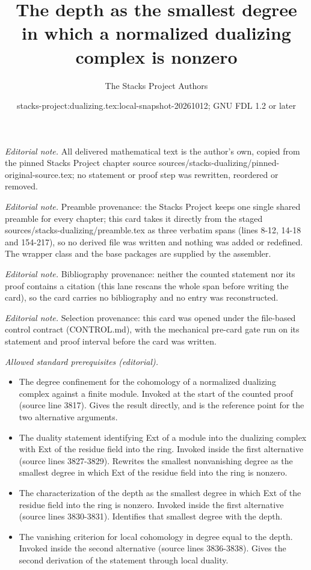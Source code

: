 \documentclass[10pt,a4paper]{amsart}
\title{The depth as the smallest degree in which a normalized dualizing complex is nonzero}
\author{The Stacks Project Authors}
\date{stacks-project:dualizing.tex:local-snapshot-20261012; GNU FDL 1.2 or later}
\theoremstyle{plain}
\theoremstyle{definition}
\theoremstyle{remark}
\numberwithin{equation}{subsection}
\begin{document}
\maketitle
\noindent\textit{Editorial note.} All delivered mathematical text is the author's own, copied from the pinned Stacks Project chapter source sources/stacks-dualizing/pinned-original-source.tex; no statement or proof step was rewritten, reordered or removed.\par\medskip
\noindent\textit{Editorial note.} Preamble provenance: the Stacks Project keeps one single shared preamble for every chapter; this card takes it directly from the staged sources/stacks-dualizing/preamble.tex as three verbatim spans (lines 8-12, 14-18 and 154-217), so no derived file was written and nothing was added or redefined. The wrapper class and the base packages are supplied by the assembler.\par\medskip
\noindent\textit{Editorial note.} Bibliography provenance: neither the counted statement nor its proof contains a citation (this lane rescans the whole span before writing the card), so the card carries no bibliography and no entry was reconstructed.\par\medskip
\noindent\textit{Editorial note.} Selection provenance: this card was opened under the file-based control contract (CONTROL.md), with the mechanical pre-card gate run on its statement and proof interval before the card was written.\par\medskip
\noindent\textit{Allowed standard prerequisites (editorial).}\begin{itemize}
\item The degree confinement for the cohomology of a normalized dualizing complex against a finite module. Invoked at the start of the counted proof (source line 3817). Gives the result directly, and is the reference point for the two alternative arguments.
\item The duality statement identifying Ext of a module into the dualizing complex with Ext of the residue field into the ring. Invoked inside the first alternative (source lines 3827-3829). Rewrites the smallest nonvanishing degree as the smallest degree in which Ext of the residue field into the ring is nonzero.
\item The characterization of the depth as the smallest degree in which Ext of the residue field into the ring is nonzero. Invoked inside the first alternative (source lines 3830-3831). Identifies that smallest degree with the depth.
\item The vanishing criterion for local cohomology in degree equal to the depth. Invoked inside the second alternative (source lines 3836-3838). Gives the second derivation of the statement through local duality.
\end{itemize}\medskip
\end{document}

